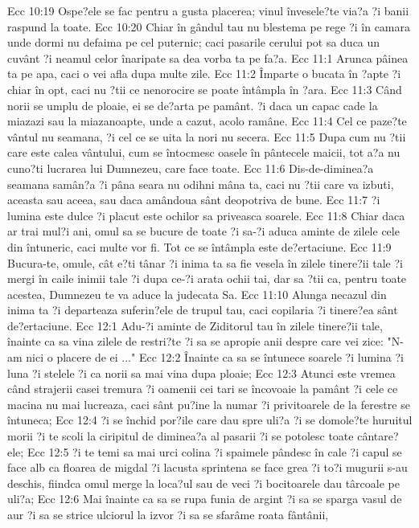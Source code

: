 Ecc 10:19  Ospe?ele se fac pentru a gusta placerea; vinul învesele?te via?a ?i banii raspund la toate.
Ecc 10:20  Chiar în gândul tau nu blestema pe rege ?i în camara unde dormi nu defaima pe cel puternic; caci pasarile cerului pot sa duca un cuvânt ?i neamul celor înaripate sa dea vorba ta pe fa?a.
Ecc 11:1  Arunca pâinea ta pe apa, caci o vei afla dupa multe zile.
Ecc 11:2  Împarte o bucata în ?apte ?i chiar în opt, caci nu ?tii ce nenorocire se poate întâmpla în ?ara.
Ecc 11:3  Când norii se umplu de ploaie, ei se de?arta pe pamânt. ?i daca un capac cade la miazazi sau la miazanoapte, unde a cazut, acolo ramâne.
Ecc 11:4  Cel ce paze?te vântul nu seamana, ?i cel ce se uita la nori nu secera.
Ecc 11:5  Dupa cum nu ?tii care este calea vântului, cum se întocmesc oasele în pântecele maicii, tot a?a nu cuno?ti lucrarea lui Dumnezeu, care face toate.
Ecc 11:6  Dis-de-diminea?a seamana samân?a ?i pâna seara nu odihni mâna ta, caci nu ?tii care va izbuti, aceasta sau aceea, sau daca amândoua sânt deopotriva de bune.
Ecc 11:7  ?i lumina este dulce ?i placut este ochilor sa priveasca soarele.
Ecc 11:8  Chiar daca ar trai mul?i ani, omul sa se bucure de toate ?i sa-?i aduca aminte de zilele cele din întuneric, caci multe vor fi. Tot ce se întâmpla este de?ertaciune.
Ecc 11:9  Bucura-te, omule, cât e?ti tânar ?i inima ta sa fie vesela în zilele tinere?ii tale ?i mergi în caile inimii tale ?i dupa ce-?i arata ochii tai, dar sa ?tii ca, pentru toate acestea, Dumnezeu te va aduce la judecata Sa.
Ecc 11:10  Alunga necazul din inima ta ?i departeaza suferin?ele de trupul tau, caci copilaria ?i tinere?ea sânt de?ertaciune.
Ecc 12:1  Adu-?i aminte de Ziditorul tau în zilele tinere?ii tale, înainte ca sa vina zilele de restri?te ?i sa se apropie anii despre care vei zice: "N-am nici o placere de ei ..."
Ecc 12:2  Înainte ca sa se întunece soarele ?i lumina ?i luna ?i stelele ?i ca norii sa mai vina dupa ploaie;
Ecc 12:3  Atunci este vremea când strajerii casei tremura ?i oamenii cei tari se încovoaie la pamânt ?i cele ce macina nu mai lucreaza, caci sânt pu?ine la numar ?i privitoarele de la ferestre se întuneca;
Ecc 12:4  ?i se închid por?ile care dau spre uli?a ?i se domole?te huruitul morii ?i te scoli la ciripitul de diminea?a al pasarii ?i se potolesc toate cântare?ele;
Ecc 12:5  ?i te temi sa mai urci colina ?i spaimele pândesc în cale ?i capul se face alb ca floarea de migdal ?i lacusta sprintena se face grea ?i to?i mugurii s-au deschis, fiindca omul merge la loca?ul sau de veci ?i bocitoarele dau târcoale pe uli?a;
Ecc 12:6  Mai înainte ca sa se rupa funia de argint ?i sa se sparga vasul de aur ?i sa se strice ulciorul la izvor ?i sa se sfarâme roata fântânii,
